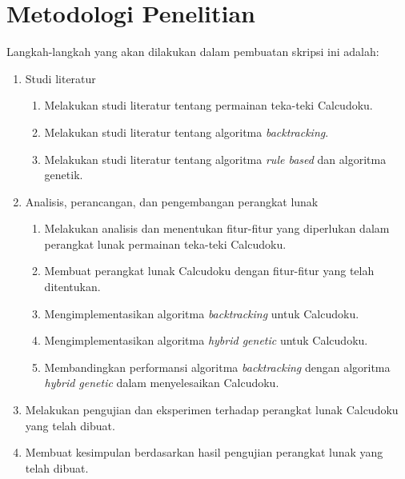 \section{Metodologi Penelitian}
\label{sec:metlit}
Langkah-langkah yang akan dilakukan dalam pembuatan skripsi ini adalah:
\begin{enumerate}
\item Studi literatur
\begin{enumerate}
\item Melakukan studi literatur tentang permainan teka-teki Calcudoku.
\item Melakukan studi literatur tentang algoritma \textit{backtracking}.
\item Melakukan studi literatur tentang algoritma \textit{rule based} dan algoritma genetik.
\end{enumerate}
\item Analisis, perancangan, dan pengembangan perangkat lunak
\begin{enumerate}
\item Melakukan analisis dan menentukan fitur-fitur yang diperlukan dalam perangkat lunak permainan teka-teki Calcudoku.
\item Membuat perangkat lunak Calcudoku dengan fitur-fitur yang telah ditentukan. 
\item Mengimplementasikan algoritma \textit{backtracking} untuk Calcudoku.
\item Mengimplementasikan algoritma \textit{hybrid genetic} untuk Calcudoku.
\item Membandingkan performansi algoritma \textit{backtracking} dengan algoritma \textit{hybrid genetic} dalam menyelesaikan Calcudoku.
\end{enumerate}
\item Melakukan pengujian dan eksperimen terhadap perangkat lunak Calcudoku yang telah dibuat.
\item Membuat kesimpulan berdasarkan hasil pengujian perangkat lunak yang telah dibuat.
\end{enumerate}

